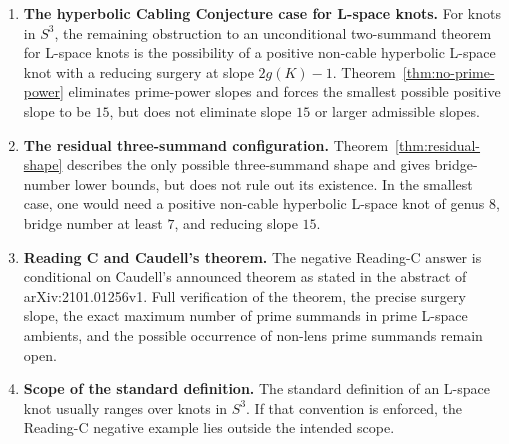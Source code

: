 \documentclass[12pt]{article}
\theoremstyle{definition}
\begin{document}
\begin{enumerate}
  \item \textbf{The hyperbolic Cabling Conjecture case for L-space knots.} For knots in \(S^3\), the remaining obstruction to an unconditional two-summand theorem for L-space knots is the possibility of a positive non-cable hyperbolic L-space knot with a reducing surgery at slope \(2g(K)-1\).  Theorem~\ref{thm:no-prime-power} eliminates prime-power slopes and forces the smallest possible positive slope to be \(15\), but does not eliminate slope \(15\) or larger admissible slopes.

  \item \textbf{The residual three-summand configuration.} Theorem~\ref{thm:residual-shape} describes the only possible three-summand shape and gives bridge-number lower bounds, but does not rule out its existence.  In the smallest case, one would need a positive non-cable hyperbolic L-space knot of genus \(8\), bridge number at least \(7\), and reducing slope \(15\).

  \item \textbf{Reading C and Caudell's theorem.} The negative Reading-C answer is conditional on Caudell's announced theorem as stated in the abstract of arXiv:2101.01256v1.  Full verification of the theorem, the precise surgery slope, the exact maximum number of prime summands in prime L-space ambients, and the possible occurrence of non-lens prime summands remain open.

  \item \textbf{Scope of the standard definition.} The standard definition of an L-space knot usually ranges over knots in \(S^3\).  If that convention is enforced, the Reading-C negative example lies outside the intended scope.
\end{enumerate}
\end{document}
